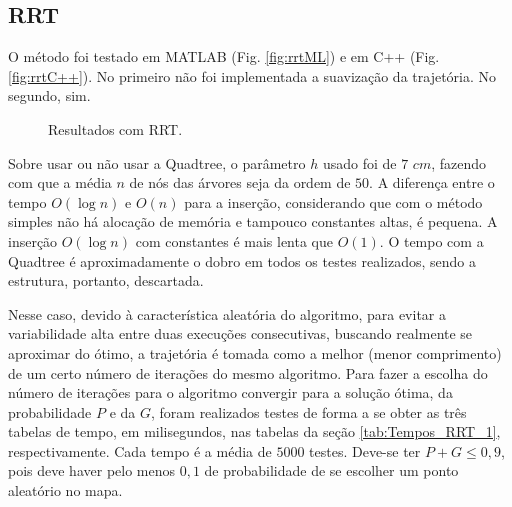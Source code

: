 \documentclass[a4paper,12pt]{article}
\begin{document}
\subsection{RRT}

O método foi testado em MATLAB (Fig. \ref{fig:rrtML}) e em C++ (Fig. \ref{fig:rrtC++}). No primeiro não foi implementada a suavização da trajetória. No segundo, sim.

\begin{figure}
\caption{Resultados com RRT.}
\end{figure}

Sobre usar ou não usar a Quadtree, o parâmetro $h$ usado foi de $7$ $cm$, fazendo com que a média $n$ de nós das árvores seja da ordem de $50$. A diferença entre o tempo $O(\log{n})$ e $O(n)$ para a inserção, considerando que com o método simples não há alocação de memória e tampouco constantes altas, é pequena. A inserção $O(\log{n})$ com constantes é mais lenta que $O(1)$. O tempo com a Quadtree é aproximadamente o dobro em todos os testes realizados, sendo a estrutura, portanto, descartada.

Nesse caso, devido à característica aleatória do algoritmo, para evitar a variabilidade alta entre duas execuções consecutivas, buscando realmente se aproximar do ótimo, a trajetória é tomada como a melhor (menor comprimento) de um certo número de iterações do mesmo algoritmo. Para fazer a escolha do número de iterações para o algoritmo convergir para a solução ótima, da probabilidade $P$ e da $G$, foram realizados testes de forma a se obter as três tabelas de tempo, em milisegundos, nas tabelas da seção \ref{tab:Tempos_RRT_1}, respectivamente. Cada tempo é a média de $5000$ testes. Deve-se ter $P + G \leq 0,9$, pois deve haver pelo menos $0,1$ de probabilidade de se escolher um ponto aleatório no mapa.
\end{document}
